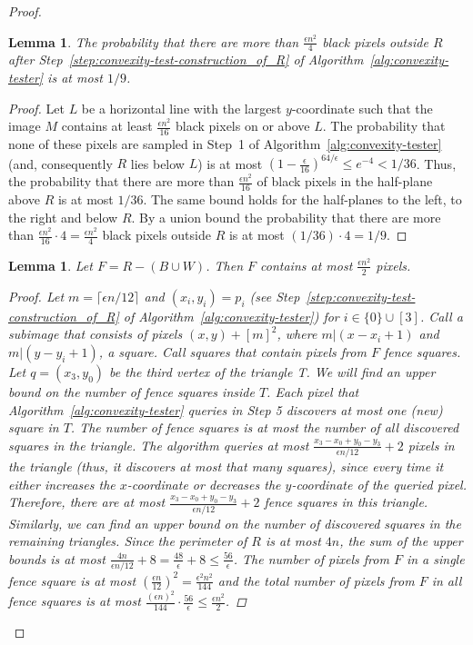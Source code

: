 \documentclass[11pt,english]{article}
\newtheorem{lemma}[theorem]{Lemma}
\numberwithin{figure}{section}
\newcommand{\eps}{{\epsilon}}
\begin{document}
\begin{proof}
\begin{lemma}\label{lem:black-pixels-outside-R}
The probability that there are more than $\frac{\eps n^2}4$ black pixels outside
$R$ after Step~\ref{step:convexity-test-construction_of_R} of Algorithm~\ref{alg:convexity-tester}
is at most $1/9$.
\end{lemma}
\begin{proof}
Let $L$ be a horizontal line with the largest $y$-coordinate such that the image
$M$ contains at least $\frac{\eps n^2}{16}$ black pixels on or above $L$. The
probability that none of these pixels are sampled in Step~1 of Algorithm~\ref{alg:convexity-tester}
(and, consequently $R$ lies below $L$) is at most
$(1-\frac{\eps}{16})^{64/\eps}\leq e^{-4}<1/36$. Thus, the probability that
there are more than $\frac{\eps n^2}{16}$ of black pixels in the half-plane
above $R$ is at most $1/36$. The same bound holds for the half-planes to the left, to the right and below $R$.
By a union bound the probability that there are more than $\frac{\eps
n^2}{16}\cdot 4=\frac{\eps n^2}{4}$ black pixels outside $R$ is at most
$(1/36)\cdot 4=1/9$.
\end{proof}
\begin{lemma}\label{lem:total_number_of_pixels_in_F}
Let $F=R-(B\cup W)$. Then $F$ contains at most $\frac{\eps n^{2}}{2}$ pixels.
\begin{proof}
Let $m=\lceil\eps n/12\rceil$ and $(x_i,y_i)=p_i$ (see Step~\ref{step:convexity-test-construction_of_R} of
Algorithm~\ref{alg:convexity-tester}) for $i\in\{0\}\cup[3]$.
Call a subimage that consists of pixels $(x,y)+[m]^{2}$, where $m|(x-x_i+1)$ and
$m|(y-y_i+1)$, a \emph{square}. Call squares that contain pixels from $F$
\emph{fence squares}. Let $q=(x_3,y_0)$ be the third vertex of the triangle T.
We will find an upper bound on the number of fence squares inside $T$.
Each pixel that Algorithm~\ref{alg:convexity-tester}
queries in Step 5 discovers at most one (new) square in $T$. The
number of fence squares is at most the number of all discovered squares in the
triangle. The algorithm queries at most $\frac{x_3-x_0+y_0-y_3}{\eps n/12}+2$
pixels in the triangle (thus, it discovers at most that many squares), since every time it either increases the $x$-coordinate or decreases the $y$-coordinate of the queried pixel.
Therefore, there are at most $\frac{x_3-x_0+y_0-y_3}{\eps n/12}+2$
fence squares in this triangle. Similarly, we can
find an upper bound on the number of discovered squares in the remaining
triangles. Since the perimeter of $R$ is at most $4n$, the sum of the upper bounds is at most
$\frac{4n}{\eps n/12}+8=\frac{48}{\eps}+8\leq \frac{56}{\eps}$.
The number of pixels from $F$ in a single
fence square is at most $(\frac{\eps n}{12})^{2}=\frac{\eps^{2} n^{2}}{144}$ and
the total number of pixels from $F$ in all
fence squares is at most $\frac{(\eps n)^{2}}{144}\cdot
\frac{56}{\eps}\leq\frac{\eps n^{2}}{2}$.
\end{proof}
\end{lemma}


\end{proof}
\end{document}
